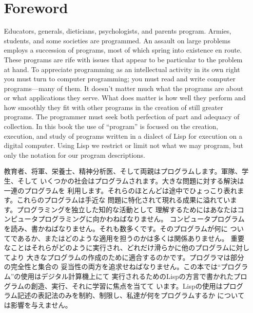 \documentclass[oneside]{book}
\begin{document}

\label{Foreword}
\chapter*{Foreword}

\vspace{-0.6em}

Educators, generals, dieticians, psychologists, and parents program.  Armies,
students, and some societies are programmed.  An assault on large problems
employs a succession of programs, most of which spring into existence en route.
These programs are rife with issues that appear to be particular to the problem
at hand.  To appreciate programming as an intellectual activity in its own
right you must turn to computer programming; you must read and write computer
programs---many of them.  It doesn't matter much what the programs are about or
what applications they serve.  What does matter is how well they perform and
how smoothly they fit with other programs in the creation of still greater
programs.  The programmer must seek both perfection of part and adequacy of
collection.  In this book the use of ``program'' is focused on the creation,
execution, and study of programs written in a dialect of Lisp for execution on
a digital computer.  Using Lisp we restrict or limit not what we may program,
but only the notation for our program descriptions.

教育者、将軍、栄養士、精神分析医、そして両親はプログラムします。軍隊、学生、そして
いくつかの社会はプログラムされます。大きな問題に対する解決は一連のプログラムを
利用します。それらのほとんどは途中でひょっこり表れます。これらのプログラムは手近な
問題に特化されて現れる成果に溢れています。プログラミングを独立した知的な活動として
理解するためにはあなたはコンピュータプログラミングに向かわねばなりません。
コンピュータプログラムを読み、書かねばなりません。それも数多くです。そのプログラムが何に
ついてであるか、またはどのような適用を担うのかは多くは関係ありません。
重要なことはそれらがどのように実行され、どれだけ滑らかに他のプログラムに対してより
大きなプログラムの作成のために適合するのかです。プログラマは部分の完全性と集合の
妥当性の両方を追求せねばなりません。この本では``プログラム''の使用はデジタル計算機上にて
実行されるためのLispの方言で書かれたプログラムの創造、実行、それに学習に焦点を当てて
います。Lispの使用はプログラム記述の表記法のみを制約、制限し、私達が何をプログラムするか
については影響を与えません。
\end{document}
